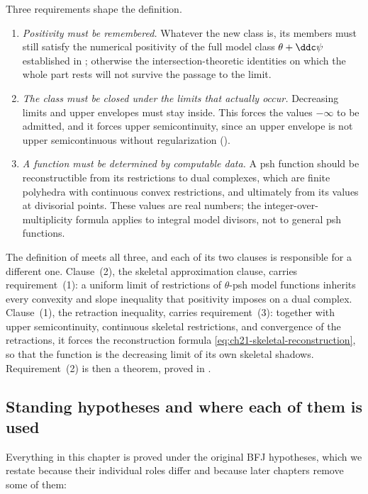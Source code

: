 Three requirements shape the definition.

\begin{enumerate}
\item \emph{Positivity must be remembered.}  Whatever the new class is, its
members must still satisfy the numerical positivity of the full model class
$\theta+\ddc\psi$ established in ;
otherwise the intersection-theoretic identities on which the whole part
rests will not survive the passage to the limit.
\item \emph{The class must be closed under the limits that actually
occur.}  Decreasing limits and upper envelopes must stay inside.  This
forces the values $-\infty$ to be admitted, and it forces upper
semicontinuity, since an upper envelope is not upper semicontinuous without
regularization ().
\item \emph{A function must be determined by computable data.}  A psh
function should be reconstructible from its restrictions to dual complexes,
which are finite polyhedra with continuous convex restrictions, and
ultimately from its values at divisorial points.  These values are real
numbers; the integer-over-multiplicity formula applies to integral model
divisors, not to general psh functions.
\end{enumerate}

The definition of  meets all three, and each of
its two clauses is responsible for a different one.  Clause~(2), the
skeletal approximation clause, carries requirement~(1): a uniform limit of
restrictions of $\theta$-psh model functions inherits every convexity and
slope inequality that positivity imposes on a dual complex.  Clause~(1), the
retraction inequality, carries requirement~(3): together with upper
semicontinuity, continuous skeletal restrictions,
and convergence of the retractions, it forces the reconstruction formula
\eqref{eq:ch21-skeletal-reconstruction}, so that the function is the
decreasing limit of its own skeletal shadows.  Requirement~(2) is then a
theorem, proved in .

\subsection{Standing hypotheses and where each of them is used}
\label{sec:ch21-hypotheses}

Everything in this chapter is proved under the original BFJ hypotheses,
which we restate because their individual roles differ and because later
chapters remove some of them:

